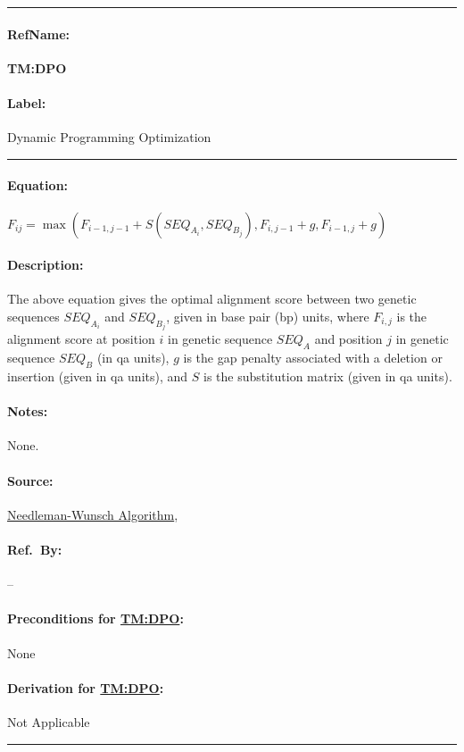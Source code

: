 \documentclass[12pt]{article}
\newcommand{\dref}[1]{GD\ref{#1}}
\newcommand{\aref}[1]{A\ref{#1}}
\newcommand{\deftheory}[9][Not Applicable]
{
\newpage
\noindent \rule{\textwidth}{0.5mm}

\paragraph{RefName: } \textbf{#2} \phantomsection 
\label{#2}

\paragraph{Label:} #3

\noindent \rule{\textwidth}{0.5mm}

\paragraph{Equation:}

#4

\paragraph{Description:}

#5

\paragraph{Notes:}

#6

\paragraph{Source:}

#7

\paragraph{Ref.\ By:}

#8

\paragraph{Preconditions for \hyperref[#2]{#2}:}
\label{#2_precond}

#9

\paragraph{Derivation for \hyperref[#2]{#2}:}
\label{#2_deriv}

#1

\noindent \rule{\textwidth}{0.5mm}

}
\begin{document}
\noindent
\deftheory
{TM:DPO}
{Dynamic Programming Optimization}
{
  $F_{ij} = \max(F_{i-1,j-1} + S(SEQ_{A_i}, SEQ_{B_j}), F_{i,j-1} + g, F_{i-1,j} + g)$
}
{

  The above equation gives the optimal alignment score between two genetic sequences $SEQ_{A_i}$ and $SEQ_{B_j}$,
  given in base pair (bp) units, where $F_{i,j}$ is the alignment score at position $i$ in genetic sequence $SEQ_A$ 
  and position $j$ in genetic sequence $SEQ_B$ (in qa units), $g$ is the gap penalty associated with a deletion 
  or insertion (given in qa units), and $S$ is the substitution matrix (given in qa units).
}
{
None.
}
{
  \href{https://en.wikipedia.org/wiki/Needleman-Wunsch_algorithm}{Needleman-Wunsch Algorithm}, \cite{NEEDLEMAN1970443}
}
{
  --
}
{
None
}
{}

\end{document}

